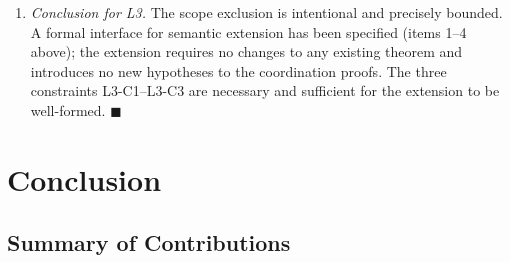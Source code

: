 \documentclass[12pt]{article}
\theoremstyle{definition}
\begin{document}
\begin{enumerate}
    \item \emph{Conclusion for L3.}
          The scope exclusion is intentional and precisely bounded.
          A formal interface for semantic extension has been
          specified (items 1--4 above); the extension requires no
          changes to any existing theorem and introduces no new
          hypotheses to the coordination proofs.  The three
          constraints L3-C1--L3-C3 are necessary and sufficient
          for the extension to be well-formed.
          $\blacksquare$
\end{enumerate}

\section{Conclusion}
\label{sec:conclusion}

\subsection{Summary of Contributions}
\label{sec:conclusion:summary}
\end{document}
